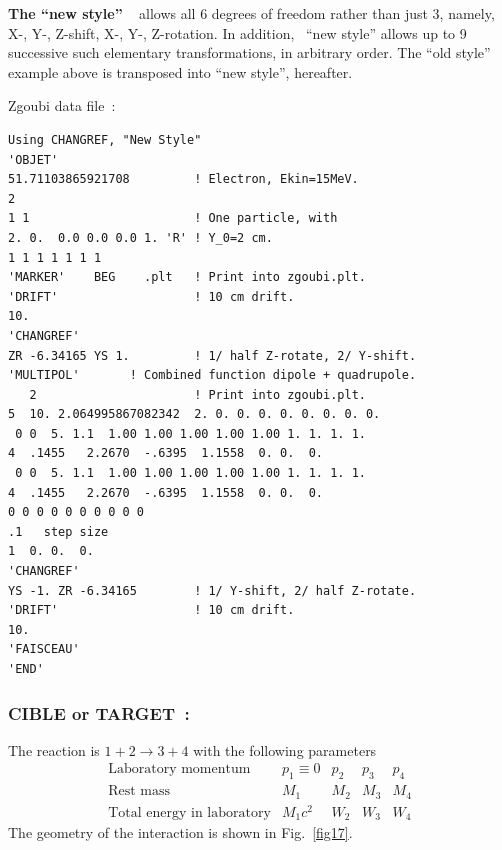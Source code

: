 



\bigskip

\noindent \textbf{The ``new style'' \CHANGREF}~ \label{CHANGREFNew}   
    allows all 6 degrees of freedom rather than just 3, namely, X-, Y-, Z-shift, X-, Y-, Z-rotation.  
In addition, \CHANGREF\  ``new style''  allows up to 9 successive such elementary transformations,  in arbitrary order. 
The ``old style'' example above is transposed into  ``new style'',  hereafter. 

\medskip

\begin{minipage}{1.\linewidth}

 Zgoubi data file~: 

\footnotesize
\begin{verbatim}
Using CHANGREF, "New Style"
'OBJET'
51.71103865921708         ! Electron, Ekin=15MeV.
2
1 1                       ! One particle, with
2. 0.  0.0 0.0 0.0 1. 'R' ! Y_0=2 cm. 
1 1 1 1 1 1 1 
'MARKER'    BEG    .plt   ! Print into zgoubi.plt.
'DRIFT'                   ! 10 cm drift.
10.
'CHANGREF'  
ZR -6.34165 YS 1.         ! 1/ half Z-rotate, 2/ Y-shift.
'MULTIPOL'       ! Combined function dipole + quadrupole.
   2                      ! Print into zgoubi.plt.
5  10. 2.064995867082342  2. 0. 0. 0. 0. 0. 0. 0. 0.
 0 0  5. 1.1  1.00 1.00 1.00 1.00 1.00 1. 1. 1. 1.                              
4  .1455   2.2670  -.6395  1.1558  0. 0.  0.                                    
 0 0  5. 1.1  1.00 1.00 1.00 1.00 1.00 1. 1. 1. 1.                              
4  .1455   2.2670  -.6395  1.1558  0. 0.  0.                                    
0 0 0 0 0 0 0 0 0 0
.1   step size
1  0. 0.  0.
'CHANGREF'
YS -1. ZR -6.34165        ! 1/ Y-shift, 2/ half Z-rotate.
'DRIFT'                   ! 10 cm drift.
10.
'FAISCEAU'
'END'
\end{verbatim}
\end{minipage}







\newpage

\subsubsection*{CIBLE or TARGET~: \CIBLETitl}
\label{CIBLE}\label{TARGET}
 
\medskip

 The reaction is $ 1+2 \longrightarrow  3+4 $ with the following parameters 
$$
\begin{array}{lllll}
	\text{Laboratory momentum} & p_1\equiv  0 &  p_2 &   p_3 &    p_4 \\
	\text{Rest mass}           &   M_1        &   M_2 & M_3 &    M_4 \\ 
	\text{Total energy in laboratory} & M_1c^2 &  W_2 &    W_3 &   W_4 
\end{array}
$$
%
 The geometry of the interaction is shown in Fig.~\ref{fig17}.   
\medskip

